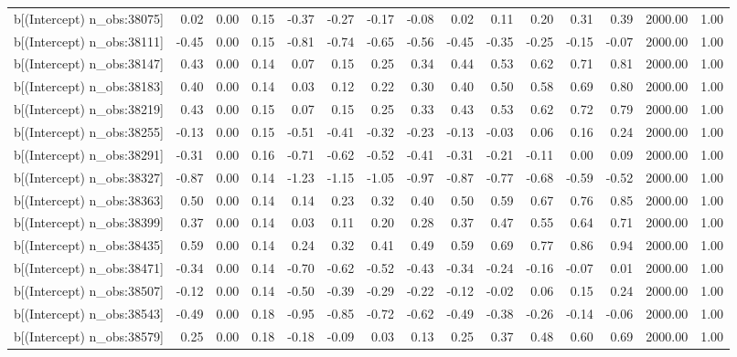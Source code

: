 \begin{table}[ht]
\begin{tabular}{rrrrrrrrrrrrrrr}
  b[(Intercept) n\_obs:38075] & 0.02 & 0.00 & 0.15 & -0.37 & -0.27 & -0.17 & -0.08 & 0.02 & 0.11 & 0.20 & 0.31 & 0.39 & 2000.00 & 1.00 \\ 
  b[(Intercept) n\_obs:38111] & -0.45 & 0.00 & 0.15 & -0.81 & -0.74 & -0.65 & -0.56 & -0.45 & -0.35 & -0.25 & -0.15 & -0.07 & 2000.00 & 1.00 \\ 
  b[(Intercept) n\_obs:38147] & 0.43 & 0.00 & 0.14 & 0.07 & 0.15 & 0.25 & 0.34 & 0.44 & 0.53 & 0.62 & 0.71 & 0.81 & 2000.00 & 1.00 \\ 
  b[(Intercept) n\_obs:38183] & 0.40 & 0.00 & 0.14 & 0.03 & 0.12 & 0.22 & 0.30 & 0.40 & 0.50 & 0.58 & 0.69 & 0.80 & 2000.00 & 1.00 \\ 
  b[(Intercept) n\_obs:38219] & 0.43 & 0.00 & 0.15 & 0.07 & 0.15 & 0.25 & 0.33 & 0.43 & 0.53 & 0.62 & 0.72 & 0.79 & 2000.00 & 1.00 \\ 
  b[(Intercept) n\_obs:38255] & -0.13 & 0.00 & 0.15 & -0.51 & -0.41 & -0.32 & -0.23 & -0.13 & -0.03 & 0.06 & 0.16 & 0.24 & 2000.00 & 1.00 \\ 
  b[(Intercept) n\_obs:38291] & -0.31 & 0.00 & 0.16 & -0.71 & -0.62 & -0.52 & -0.41 & -0.31 & -0.21 & -0.11 & 0.00 & 0.09 & 2000.00 & 1.00 \\ 
  b[(Intercept) n\_obs:38327] & -0.87 & 0.00 & 0.14 & -1.23 & -1.15 & -1.05 & -0.97 & -0.87 & -0.77 & -0.68 & -0.59 & -0.52 & 2000.00 & 1.00 \\ 
  b[(Intercept) n\_obs:38363] & 0.50 & 0.00 & 0.14 & 0.14 & 0.23 & 0.32 & 0.40 & 0.50 & 0.59 & 0.67 & 0.76 & 0.85 & 2000.00 & 1.00 \\ 
  b[(Intercept) n\_obs:38399] & 0.37 & 0.00 & 0.14 & 0.03 & 0.11 & 0.20 & 0.28 & 0.37 & 0.47 & 0.55 & 0.64 & 0.71 & 2000.00 & 1.00 \\ 
  b[(Intercept) n\_obs:38435] & 0.59 & 0.00 & 0.14 & 0.24 & 0.32 & 0.41 & 0.49 & 0.59 & 0.69 & 0.77 & 0.86 & 0.94 & 2000.00 & 1.00 \\ 
  b[(Intercept) n\_obs:38471] & -0.34 & 0.00 & 0.14 & -0.70 & -0.62 & -0.52 & -0.43 & -0.34 & -0.24 & -0.16 & -0.07 & 0.01 & 2000.00 & 1.00 \\ 
  b[(Intercept) n\_obs:38507] & -0.12 & 0.00 & 0.14 & -0.50 & -0.39 & -0.29 & -0.22 & -0.12 & -0.02 & 0.06 & 0.15 & 0.24 & 2000.00 & 1.00 \\ 
  b[(Intercept) n\_obs:38543] & -0.49 & 0.00 & 0.18 & -0.95 & -0.85 & -0.72 & -0.62 & -0.49 & -0.38 & -0.26 & -0.14 & -0.06 & 2000.00 & 1.00 \\ 
  b[(Intercept) n\_obs:38579] & 0.25 & 0.00 & 0.18 & -0.18 & -0.09 & 0.03 & 0.13 & 0.25 & 0.37 & 0.48 & 0.60 & 0.69 & 2000.00 & 1.00 \\ 

\end{tabular}
\end{table}
